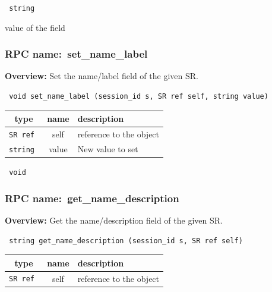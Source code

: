 {\tt 
string
}


value of the field
\vspace{0.3cm}
\vspace{0.3cm}
\vspace{0.3cm}
\subsubsection{RPC name:~set\_name\_label}

{\bf Overview:} 
Set the name/label field of the given SR.

\begin{verbatim} void set_name_label (session_id s, SR ref self, string value)\end{verbatim}



 
\vspace{0.3cm}
\begin{tabular}{|c|c|p{7cm}|}
 \hline
{\bf type} & {\bf name} & {\bf description} \\ \hline
{\tt SR ref } & self & reference to the object \\ \hline 

{\tt string } & value & New value to set \\ \hline 

\end{tabular}

\vspace{0.3cm}

{\tt 
void
}



\vspace{0.3cm}
\vspace{0.3cm}
\vspace{0.3cm}
\subsubsection{RPC name:~get\_name\_description}

{\bf Overview:} 
Get the name/description field of the given SR.

\begin{verbatim} string get_name_description (session_id s, SR ref self)\end{verbatim}



 
\vspace{0.3cm}
\begin{tabular}{|c|c|p{7cm}|}
 \hline
{\bf type} & {\bf name} & {\bf description} \\ \hline
{\tt SR ref } & self & reference to the object \\ \hline 

\end{tabular}

